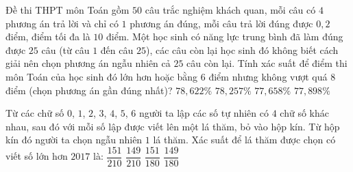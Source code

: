 \begin{ex}%
	Đề thi THPT môn Toán gồm $50$ câu trắc nghiệm khách quan, mỗi câu có $4$ phương án trả lời và chỉ có $1$
	phương án đúng, mỗi câu trả lời đúng được $0,2$ điểm, điểm tối đa là $10$ điểm. Một học sinh có năng lực trung
	bình đã làm đúng được $25$ câu (từ câu $1$ đến câu $25$), các câu còn lại học sinh đó không biết cách giải nên chọn
	phương án ngẫu nhiên cả $25$ câu còn lại. Tính xác suất để điểm thi môn Toán của học sinh đó lớn hơn hoặc
	bằng $6$ điểm nhưng không vượt quá $8$ điểm (chọn phương án gần đúng nhất)?
	\choice
	{\True $78,622\%$}
	{$78,257\%$}
	{$77,658\%$}
	{$77,898\%$}
\end{ex}

\begin{ex}%
	Từ các chữ số $0$, $1$, $2$, $3$, $4$, $5$, $6$ người ta lập các số tự nhiên có $4$ chữ số khác nhau, sau đó với mỗi số
	lập được viết lên một lá thăm, bỏ vào hộp kín. Từ hộp kín đó người ta chọn ngẫu nhiên $1$ lá thăm. Xác suất để
	lá thăm được chọn có viết số lớn hơn $2017$ là:
	\choice
	{$\dfrac{151}{210}$}
	{$\dfrac{149}{210}$}
	{$\dfrac{151}{180}$}
	{\True $\dfrac{149}{180}$}
\end{ex}

